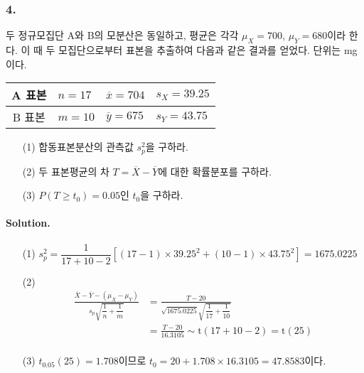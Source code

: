 \subsubsection{4.} 두 정규모집단 A와 B의 모분산은 동일하고, 평균은 각각 $\mu_X=700$, $\mu_Y=680$이라 한다.
이 때 두 모집단으로부터 표본을 추출하여 다음과 같은 결과를 얻었다. 단위는 mg이다.

\begin{center}
    \begin{tabular}{c|lll}
        \hline
        A 표본 & $n=17$ & $\overline{x} = 704$ & $s_X = 39.25$ \\
        \hline
        B 표본 & $m=10$ & $\overline{y} = 675$ & $s_Y = 43.75$ \\
        \hline
    \end{tabular}
\end{center}

\begin{itemize}
    \item[(1)] 합동표본분산의 관측값 $s_p^2$을 구하라.
    \item[(2)] 두 표본평균의 차 $T=\overline{X}-\overline{Y}$에 대한 확률분포를 구하라.
    \item[(3)] $P\left(T \geq t_0\right)=0.05$인 $t_0$을 구하라.  
\end{itemize}

\paragraph{Solution.}
\begin{itemize}
    \item[(1)] {
        $s_p^2 = \dfrac{1}{17+10-2}\left[\left(17-1\right)\times 39.25^2 + \left(10-1\right)\times 43.75^2\right]=1675.0225$
    }
    \item[(2)] {
        \begin{align*}
            \frac{\overline{X}-\overline{Y}-\left(\mu_X-\mu_Y\right)}{s_p\sqrt{\dfrac{1}{n}+\dfrac{1}{m}}}
            &= \frac{T-20}{\sqrt{1675.0225}\sqrt{\dfrac{1}{17}+\dfrac{1}{10}}} \\
            &= \frac{T-20}{16.3105} \sim \mathrm{t}\left(17+10-2\right) = \mathrm{t}\left(25\right) \\
        \end{align*}
    }
    \item[(3)] {
        $t_{0.05}\left(25\right)=1.708$이므로 $t_0=20+1.708\times16.3105=47.8583$이다.
    }
\end{itemize}

